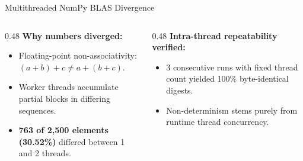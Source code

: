 \documentclass[aspectratio=169]{beamer}
\begin{document}
\begin{frame}{Multithreaded NumPy BLAS Divergence}
    \vspace{0.3cm}
    \begin{columns}[T]
        \begin{column}{0.48\textwidth}
            \footnotesize
            \textbf{Why numbers diverged:}
            \begin{itemize}
                \item Floating-point non-associativity: $(a + b) + c \neq a + (b + c)$.
                \item Worker threads accumulate partial blocks in differing sequences.
                \item \textbf{763 of 2,500 elements (30.52\%)} differed between 1 and 2 threads.
            \end{itemize}
        \end{column}
        \begin{column}{0.48\textwidth}
            \footnotesize
            \textbf{Intra-thread repeatability verified:}
            \begin{itemize}
                \item 3 consecutive runs with fixed thread count yielded 100\% byte-identical digests.
                \item Non-determinism stems purely from runtime thread concurrency.
            \end{itemize}
        \end{column}
    \end{columns}
\end{frame}
\end{document}
